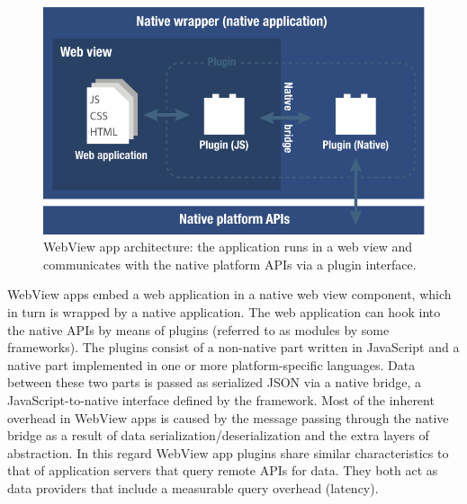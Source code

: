 \documentclass[thesis.tex]{subfiles}
\begin{document}
\begin{figure}[ht]
\centering \includegraphics[width=\textwidth]{images/web-view-app-structure}
\caption{WebView app architecture: the application runs in a web view and communicates with the native platform APIs via a plugin interface.\label{fig:web-view-app}}
\end{figure}

WebView apps embed a web application in a native web view component, which in turn is wrapped by a native application. The web application can hook into the native APIs by means of plugins (referred to as modules by some frameworks). The plugins consist of a non-native part written in JavaScript and a native part implemented in one or more platform-specific languages. Data between these two parts is passed as serialized JSON via a native bridge, a JavaScript-to-native interface defined by the framework. Most of the inherent overhead in WebView apps is caused by the message passing through the native bridge as a result of data serialization/deserialization and the extra layers of abstraction. In this regard WebView app plugins share similar characteristics to that of application servers that query remote APIs for data. They both act as data providers that include a measurable query overhead (latency).
\end{document}
